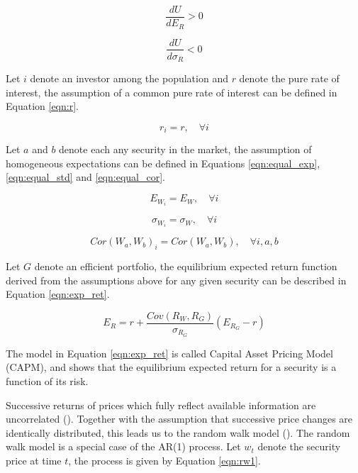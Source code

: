 \documentclass[cic,tc, english]{iiufrgs}
\begin{document}
    \begin{equation}
        \label{eqn:der1}
        \frac{dU}{dE_R} > 0
    \end{equation}

    \begin{equation}
        \label{eqn:der2}
        \frac{dU}{d\sigma_R} < 0
    \end{equation}

    Let $i$ denote an investor among the population and $r$ denote the pure rate of interest, the assumption of a common pure rate of interest can be defined in Equation \ref{eqn:r}.

    \begin{equation}
        \label{eqn:r}
        r_i = r, \quad \forall i
    \end{equation}

    Let $a$ and $b$ denote each any security in the market, the assumption of homogeneous expectations can be defined in Equations \ref{eqn:equal_exp}, \ref{eqn:equal_std} and \ref{eqn:equal_cor}.

    \begin{equation}
        \label{eqn:equal_exp}
        E_{W_i} = E_W, \quad \forall i
    \end{equation}

    \begin{equation}
        \label{eqn:equal_std}
        \sigma_{W_i} = \sigma_W, \quad \forall i
    \end{equation}

    \begin{equation}
        \label{eqn:equal_cor}
        Cor(W_a, W_b)_i = Cor(W_a, W_b), \quad \forall i, a, b
    \end{equation}

    Let $G$ denote an efficient portfolio, the equilibrium expected return function derived from the assumptions above for any given security can be described in Equation \ref{eqn:exp_ret}.

    \begin{equation}
        \label{eqn:exp_ret}
        E_R = r + \frac{Cov(R_W, R_G)}{\sigma_{R_G}} (E_{R_G} - r)
    \end{equation}

    The model in Equation \ref{eqn:exp_ret} is called Capital Asset Pricing Model (CAPM), and shows that the equilibrium expected return for a security is a function of its risk.
    
    Successive returns of prices which fully reflect available information are uncorrelated (\citet{samuelson1965}). Together with the assumption that successive price changes are identically distributed, this leads us to the random walk model (\citet{fama1970}). The random walk model is a special case of the AR(1) process. Let $w_t$ denote the security price at time $t$, the process is given by Equation \ref{eqn:rw1}.
    
\end{document}
